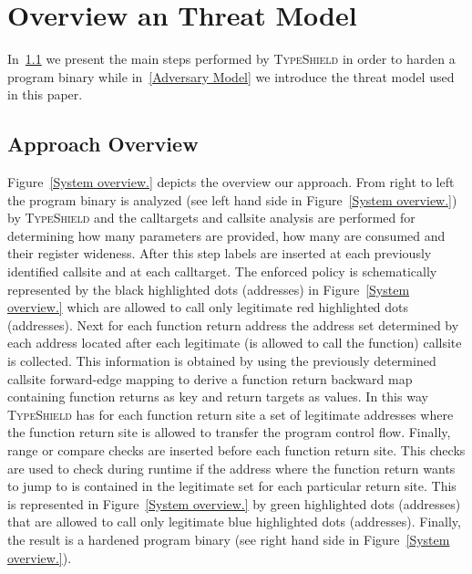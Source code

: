 \section{Overview an Threat Model}
\label{chapter:TypeShild Overview}
In~\cref{Overview} we present the main steps performed by \textsc{TypeShield} in order to harden a program binary
while  
in~\cref{Adversary Model} we introduce the threat model used in this paper.
\subsection{Approach Overview}
\label{Overview}
Figure~\ref{System overview.} depicts the overview our approach.
From right to left the program binary is analyzed (see left hand side in Figure~\ref{System overview.}) by \textsc{TypeShield} and the calltargets
and callsite analysis are performed for determining 
how many parameters are provided, 
how many are consumed and their register wideness.
After this step labels are inserted at each previously identified callsite and at each calltarget. 
The enforced policy is schematically represented by the black highlighted dots (addresses) in Figure~\ref{System overview.} which are allowed to call only legitimate red highlighted dots (addresses).
Next for each function return address the address set determined by each address located after each legitimate (is allowed to call the function) callsite is collected.
This information is obtained by using the previously determined callsite forward-edge mapping to derive a function return backward map containing function returns as key and return targets as values.
In this way \textsc{TypeShield} has for each function return site a set of legitimate addresses where the function return site is allowed to transfer the program control flow.
Finally, range or compare checks are inserted before each function return site. This checks are used to check during runtime if the 
address where the function return wants to jump to is contained in the legitimate set for each particular return site.
This is represented in Figure~\ref{System overview.} by green highlighted dots (addresses) that are allowed to call only legitimate blue highlighted dots (addresses).
Finally, the result is a hardened program binary (see right hand side in Figure~\ref{System overview.}).



